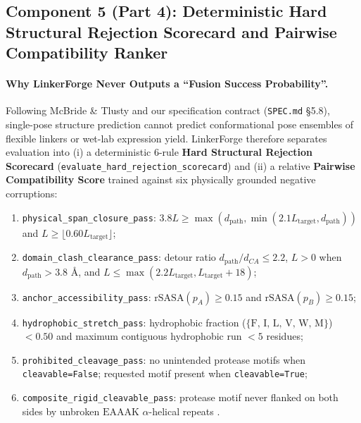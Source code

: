 \documentclass[11pt]{article}
\begin{document}
\subsection{Component 5 (Part 4): Deterministic Hard Structural Rejection Scorecard and Pairwise Compatibility Ranker}
\label{sec:method_part4}

\paragraph{Why LinkerForge Never Outputs a ``Fusion Success Probability''.}
Following McBride \& Tlusty \cite{mcbride2026pose} and our specification contract (\texttt{SPEC.md} \S5.8), single-pose structure prediction cannot predict conformational pose ensembles of flexible linkers or wet-lab expression yield. LinkerForge therefore separates evaluation into (i) a deterministic 6-rule \textbf{Hard Structural Rejection Scorecard} (\texttt{evaluate\_hard\_rejection\_scorecard}) and (ii) a relative \textbf{Pairwise Compatibility Score} trained against six physically grounded negative corruptions:
\begin{enumerate}
  \item \texttt{physical\_span\_closure\_pass}: $3.8 L \ge \max(d_{\text{path}}, \min(2.1 L_{\text{target}}, d_{\text{path}}))$ and $L \ge \lfloor 0.60 L_{\text{target}} \rfloor$;
  \item \texttt{domain\_clash\_clearance\_pass}: detour ratio $d_{\text{path}}/d_{CA} \le 2.2$, $L > 0$ when $d_{\text{path}} > 3.8\text{ \AA}$, and $L \le \max(2.2 L_{\text{target}}, L_{\text{target}}+18)$;
  \item \texttt{anchor\_accessibility\_pass}: $\text{rSASA}(p_A) \ge 0.15$ and $\text{rSASA}(p_B) \ge 0.15$;
  \item \texttt{hydrophobic\_stretch\_pass}: hydrophobic fraction ($\{\text{F, I, L, V, W, M}\}$) $< 0.50$ and maximum contiguous hydrophobic run $< 5$ residues;
  \item \texttt{prohibited\_cleavage\_pass}: no unintended protease motifs when \texttt{cleavable=False}; requested motif present when \texttt{cleavable=True};
  \item \texttt{composite\_rigid\_cleavable\_pass}: protease motif never flanked on both sides by unbroken $\text{EAAAK}$ $\alpha$-helical repeats \cite{hubbard1994proteolysis}.
\end{enumerate}
\end{document}
